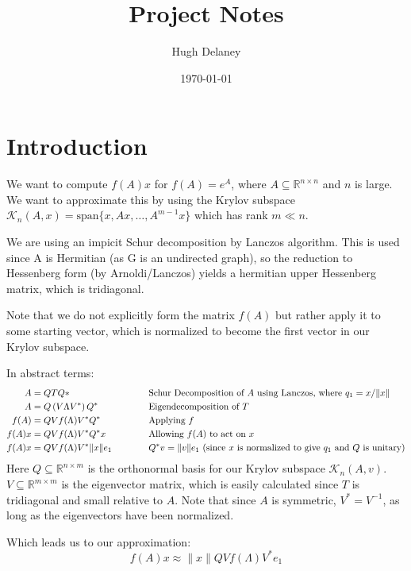 \documentclass[a4paper, fleqn]{article}
\date{\today}
\author{Hugh Delaney}
\title{Project Notes}
\begin{document}
\maketitle
\section{Introduction}%
\label{sec:introduction}



We want to compute $f(A)x$ for $f(A) = e^A$, where $A \subseteq \mathbb{R}^{n\times n}$ and $n$ is large. We want to approximate this by using the Krylov subspace $\mathcal{K}_n\left( A, x \right) = \text{span}\{x, Ax, \ldots, A^{m-1}x\}$ which has rank $m \ll n$.

We are using an impicit Schur decomposition by Lanczos algorithm. This is used since A is Hermitian (as G is an undirected graph), so the reduction to Hessenberg form (by Arnoldi/Lanczos) yields a hermitian upper Hessenberg matrix, which is tridiagonal.

Note that we do not explicitly form the matrix $f(A)$ but rather apply it to some starting vector, which is normalized to become the first vector in our Krylov subspace.

In abstract terms:
\begin{alignat*}{4}
        A &= QTQ* &&\text{\quad\quad} &&\text{Schur Decomposition of $A$ using Lanczos, where $q_1 = x/\|x\|$} \\
        A &=  Q \left( V\Lambda V^*\right)Q^* && &&\text{Eigendecomposition of $T$}\\
        f(A) &= QVf(\Lambda)V^*Q^* && &&\text{Applying $f$}\\
        f(A)x &= QVf(\Lambda)V^*Q^*x && &&\text{Allowing $f(A)$ to act on $x$}\\
        f(A)x &= QVf(\Lambda)V^*\|x\|e_1 && &&\text{$Q^*v = \|v\|e_1$ (since $x$ is normalized to give  $q_1$ and $Q$ is unitary)} \\
\end{alignat*}
Here $Q \subseteq \mathbb{R}^{n \times m}$ is the orthonormal basis for our Krylov subspace $\mathcal{K}_n\left( A, v \right) $. $V \subseteq \mathbb{R}^{m \times m}$ is the eigenvector matrix, which is easily calculated since $T$ is tridiagonal and small relative to $A$. Note that since $A$ is symmetric, $V^* = V^{-1}$, as long as the eigenvectors have been normalized.

Which leads us to our approximation:
\begin{equation}
        f(A)x \approx  \|x\| QVf(\Lambda)V^*e_1
\end{equation} 
\end{document}
